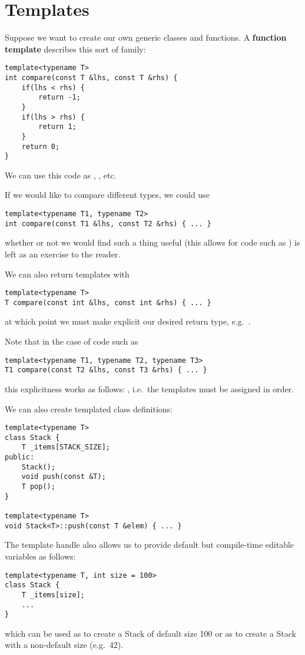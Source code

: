 \documentclass[12pt]{article}
\begin{document}
\section{Templates}
Suppose we want to create our own generic classes and functions. A {\bf function template} describes this sort of family:
\begin{verbatim}
template<typename T>
int compare(const T &lhs, const T &rhs) {
    if(lhs < rhs) {
        return -1;
    }
    if(lhs > rhs) {
        return 1;
    }
    return 0;
}
\end{verbatim}

We can use this code as , , etc.

If we would like to compare different types, we could use
\begin{verbatim}
template<typename T1, typename T2>
int compare(const T1 &lhs, const T2 &rhs) { ... }
\end{verbatim}
whether or not we would find such a thing useful (this allows for code such as ) is left as an exercise to the reader.

We can also return templates with
\begin{verbatim}
template<typename T>
T compare(const int &lhs, const int &rhs) { ... }
\end{verbatim}
at which point we must make explicit our desired return type, e.g.\ .

Note that in the case of code such as
\begin{verbatim}
template<typename T1, typename T2, typename T3>
T1 compare(const T2 &lhs, const T3 &rhs) { ... }
\end{verbatim}
this explicitness works as follows: , i.e.\ the templates must be assigned in order.

We can also create templated class definitions:
\begin{verbatim}
template<typename T>
class Stack {
    T _items[STACK_SIZE];
public:
    Stack();
    void push(const &T);
    T pop();
}

template<typename T>
void Stack<T>::push(const T &elem) { ... }
\end{verbatim}

The template handle also allows us to provide default but compile-time editable variables as follows:
\begin{verbatim}
template<typename T, int size = 100>
class Stack {
    T _items[size];
    ...
}
\end{verbatim}
which can be used as  to create a Stack of default size 100 or as  to create a Stack with a non-default size (e.g.\ 42).
\end{document}
